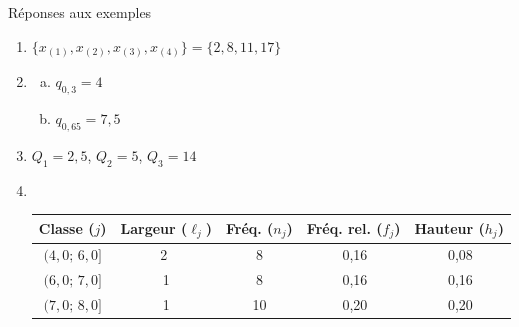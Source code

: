 \documentclass{BeamerTemplate}
\begin{document}
\begin{frame}[t]{Réponses aux exemples}

{\scriptsize
\begin{enumerate}
  \item $\{x_{(1)}, x_{(2)}, x_{(3)}, x_{(4)}\}=\{2, 8, 11, 17\}$
  \item
      \begin{enumerate}[a)]
      \item $q_{0,3}=4$
      \item $q_{0,65}=7,5$
     \end{enumerate}
  \item $Q_1=2,5$, $Q_2=5$, $Q_3=14$
  \item $\mbox{ }$

  \begin{tabular}{ccccc}\hline
Classe ($j$) & Largeur ($\ell_j$) & Fréq. ($n_j$) & Fréq. rel. ($f_j$) & Hauteur ($h_j$) \\ \hline
$(4,0;\, 6,0]$ & \ 2 \   & 8 & \ \   0,16  \  &  \ \ 0,08  \  \\
$(6,0;\, 7,0]$ & \  1\   & 8 & \  \  0,16  \  &  \ \ 0,16  \  \\
$(7,0;\, 8,0]$ &  \ 1\   & 10 & \  \ 0,20   \  &  \ \ 0,20  \  \\\hline
\end{tabular}

 \end{enumerate}
 }
\end{frame}
\end{document}
